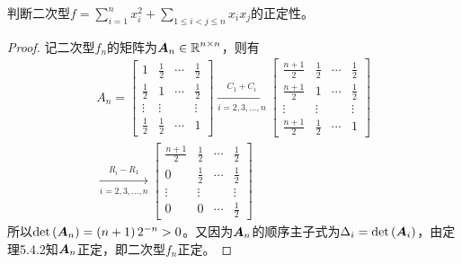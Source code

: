 \begin{problem}
判断二次型\(f=\sum_{i=1}^nx_i^2+\sum_{1\le i<j\le n}x_ix_j\)的正定性。
\end{problem}
\begin{proof}
    记二次型\(f_n\)的矩阵为\(\boldsymbol{A}_n\in\boldsymbol{\mathbb{R}}^{n\times n}\)，则有
    \begin{gather*}
        A_n =
        \begin{bmatrix}
            1           & \frac{1}{2} & \cdots & \frac{1}{2} \\
            \frac{1}{2} & 1           & \cdots & \frac{1}{2} \\
            \vdots      & \vdots      &        & \vdots      \\
            \frac{1}{2} & \frac{1}{2} & \cdots & 1
        \end{bmatrix}\xrightarrow[i=2,3,\dots,n]{C_1+C_i}
        \begin{bmatrix}
            \frac{n+1}{2} & \frac{1}{2} & \cdots & \frac{1}{2} \\
            \frac{n+1}{2} & 1           & \cdots & \frac{1}{2} \\
            \vdots        & \vdots      &        & \vdots      \\
            \frac{n+1}{2} & \frac{1}{2} & \cdots & 1
        \end{bmatrix} \\
        \xrightarrow[i=2,3,\dots,n]{R_i-R_1}
        \begin{bmatrix}
            \frac{n+1}{2} & \frac{1}{2} & \cdots & \frac{1}{2} \\
            0             & \frac{1}{2} & \cdots & \frac{1}{2} \\
            \vdots        & \vdots      &        & \vdots      \\
            0             & 0           & \cdots & \frac{1}{2}
        \end{bmatrix}
    \end{gather*}
    所以\(\mathrm{det}\left( \boldsymbol{A}_n \right)=\left( n+1 \right)2^{-n}>0\)。又因为\(\boldsymbol{A}_n\)的顺序主子式为\(\Delta_i=\mathrm{det}\left( \boldsymbol{A}_i \right)\)，由定理5.4.2知\(\boldsymbol{A}_n\)正定，即二次型\(f_n\)正定。
\end{proof}

